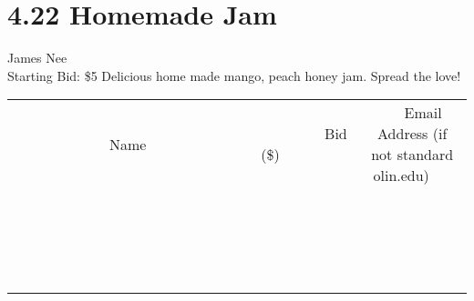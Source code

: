 \documentclass[11pt]{article}
\begin{document}
\section*{4.22 Homemade Jam}
James Nee
\\
Starting Bid: \$5
\newline
Delicious home made mango, peach honey jam. Spread the love!
\\[3ex]
\begin{tabular}{c c c}
~~~~~~~~~~~~~Name~~~~~~~~~~~~~ & ~~~~~~~~~Bid (\$)~~~~~~~~~  & ~~~Email Address (if not standard olin.edu)~~~\\
 & & \\
\hline
 & & \\
\hline
 & & \\
\hline
 & & \\
\hline
 & & \\
\hline
 & & \\
\hline
 & & \\
\hline
 & & \\
\hline
 & & \\
\hline
 & & \\
\hline
 & & \\
\hline
 & & \\
\hline
 & & \\
\hline
 & & \\
\hline
 & & \\
\hline
 & & \\
\hline
 & & \\
\hline
 & & \\
\hline
 & & \\
\hline
\end{tabular}
\newpage
\end{document}
